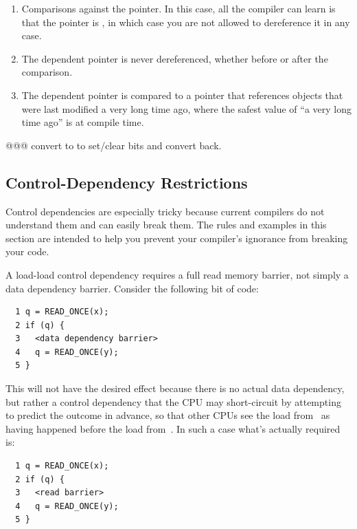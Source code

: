 \begin{enumerate}
\item	Comparisons against the  pointer.
	In this case, all the compiler can learn is that the pointer
	is , in which case you are not allowed to
	dereference it in any case.
\item	The dependent pointer is never dereferenced, whether before or
	after the comparison.
\item	The dependent pointer is compared to a pointer that references
	objects that were last modified a very long time ago, where
	the safest value of ``a very long time ago'' is at compile time.
\end{enumerate}

@@@ convert to  to set/clear bits and convert back.


\subsection{Control-Dependency Restrictions}
\label{sec:memorder:Control-Dependency Restrictions}

Control dependencies are especially tricky because current compilers
do not understand them and can easily break them.
The rules and examples in this section are intended to help you
prevent your compiler's ignorance from breaking your code.

A load-load control dependency requires a full read memory barrier,
not simply a data dependency barrier.
Consider the following bit of code:

\vspace{5pt}
\begin{minipage}[t]{\columnwidth}
\scriptsize
\begin{verbatim}
  1 q = READ_ONCE(x);
  2 if (q) {
  3   <data dependency barrier>
  4   q = READ_ONCE(y);
  5 }
\end{verbatim}
\end{minipage}
\vspace{5pt}

This will not have the desired effect because there is no actual data
dependency, but rather a control dependency that the CPU may short-circuit
by attempting to predict the outcome in advance, so that other CPUs see
the load from~ as having happened before the load from~.
In such a case what's actually required is:

\vspace{5pt}
\begin{minipage}[t]{\columnwidth}
\scriptsize
\begin{verbatim}
  1 q = READ_ONCE(x);
  2 if (q) {
  3   <read barrier>
  4   q = READ_ONCE(y);
  5 }
\end{verbatim}
\end{minipage}
\vspace{5pt}

